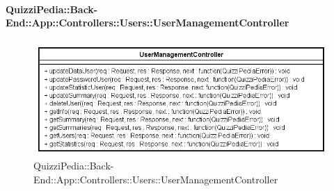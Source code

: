 \paragraph[QuizziPedia::Back-End::App::Controllers::Users\\::UserManagementController]{QuizziPedia::Back-End::App::Controllers::Users::UserManagementController}
\label{QuizziPedia::Back-End::App::Controllers::Users::UserManagementController}
\begin{figure}[ht]
	\centering
	\includegraphics[scale=0.8]{UML/Classi/Back-End/QuizziPedia_Back-End_App_Controllers_Users_UserManagementController.png}
	\caption{QuizziPedia::Back-End::App::Controllers::Users::UserManagementController}
\end{figure}
\FloatBarrier
